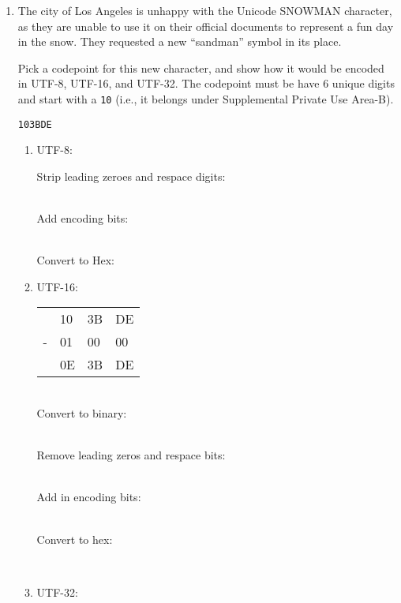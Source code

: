 \documentclass[11pt]{article}
\begin{document}
\begin{enumerate}
\item The city of Los Angeles is unhappy with the Unicode SNOWMAN character,
as they are unable to use it on their official documents to represent a fun day in the snow.
They requested a new ``sandman'' symbol in its place.

Pick a codepoint for this new character, and show how it would be encoded in UTF-8, UTF-16, and UTF-32.
The codepoint must be have 6 unique digits and start with a \texttt{10} (i.e., it belongs under
Supplemental Private Use Area-B).

\texttt{103BDE}


\begin{enumerate}
\item UTF-8:

Strip leading zeroes and respace digits:

\\

Add encoding bits:

\\

Convert to Hex:


\item UTF-16:

\begin{tabular}{l l l l}
&10&3B&DE\\
-&01&00&00\\
\hline
&0E&3B&DE 
\end{tabular}\\

Convert to binary:

\\

Remove leading zeros and respace bits:

\\

Add in encoding bits:

\\

Convert to hex:

\\

\item UTF-32:


\end{enumerate}
\end{enumerate}
\end{document}
